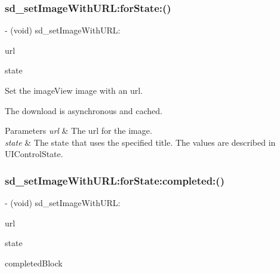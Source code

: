\subsubsection{\texorpdfstring{sd\+\_\+set\+Image\+With\+U\+R\+L\+:for\+State\+:()}{sd\_setImageWithURL:forState:()}\hspace{0.1cm}{\footnotesize\ttfamily [3/3]}}
{\footnotesize\ttfamily -\/ (void) sd\+\_\+set\+Image\+With\+U\+R\+L\+: \begin{DoxyParamCaption}\item[{(N\+S\+U\+RL $\ast$)}]{url }\item[{forState:(U\+I\+Control\+State)}]{state }\end{DoxyParamCaption}}

Set the image\+View {\ttfamily image} with an {\ttfamily url}.

The download is asynchronous and cached.


\begin{DoxyParams}{Parameters}
{\em url} & The url for the image. \\
\hline
{\em state} & The state that uses the specified title. The values are described in U\+I\+Control\+State. \\
\hline
\end{DoxyParams}
\mbox{\label{category_u_i_button_07_web_cache_08_abddfa42effe159e9f3089c474ad9753c}} 
\subsubsection{\texorpdfstring{sd\+\_\+set\+Image\+With\+U\+R\+L\+:for\+State\+:completed\+:()}{sd\_setImageWithURL:forState:completed:()}\hspace{0.1cm}{\footnotesize\ttfamily [1/3]}}
{\footnotesize\ttfamily -\/ (void) sd\+\_\+set\+Image\+With\+U\+R\+L\+: \begin{DoxyParamCaption}\item[{(N\+S\+U\+RL $\ast$)}]{url }\item[{forState:(U\+I\+Control\+State)}]{state }\item[{completed:(S\+D\+Web\+Image\+Completion\+Block)}]{completed\+Block }\end{DoxyParamCaption}}

